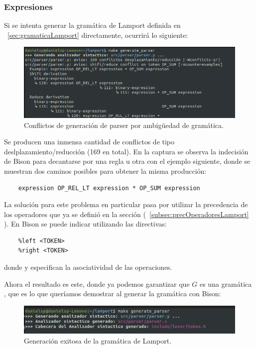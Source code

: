 \subsubsection{Expresiones}
Si se intenta generar la gramática de Lamport definida en ~\ref{sec:gramaticaLamport} directamente, ocurrirá lo siguiente:
\begin{figure}[h]
    \includegraphics[width=\linewidth]{images/implementacion/parser/parser_conflicts.png}
    \caption{Conflictos de generación de parser por ambigüedad de gramática.}
    \label{fig:parser_conflictos}
\end{figure}

Se producen una inmensa cantidad de conflictos de tipo deslplazamiento/reducción (169 en total). En la captura se observa la indecisión de Bison para decantarse por una regla u otra con el ejemplo siguiente, donde se muestran dos caminos posibles para obtener la misma producción:

\begin{verbatim}
    expression OP_REL_LT expression * OP_SUM expression
\end{verbatim}



La solución para este problema en particular pasa por utilizar la precedencia de los operadores que ya se definió en la sección (~\ref{subsec:precOperadoresLamport} ). En Bison se puede indicar utilizando las directivas:

\begin{verbatim}
    %left <TOKEN>
    %right <TOKEN>
\end{verbatim}

\noindent
donde  y  especifican la asociatividad de las operaciones.



Ahora el resultado es este, donde ya podemos garantizar que $G$ es una gramática , que es lo que queríamos demostrar al generar la gramática con Bison:
\begin{figure}[h]
    \includegraphics[width=\linewidth]{images/implementacion/parser/parser_success.png}
    \caption{Generación exitosa de la gramática de Lamport.}
    \label{fig:parser_success}
\end{figure}

